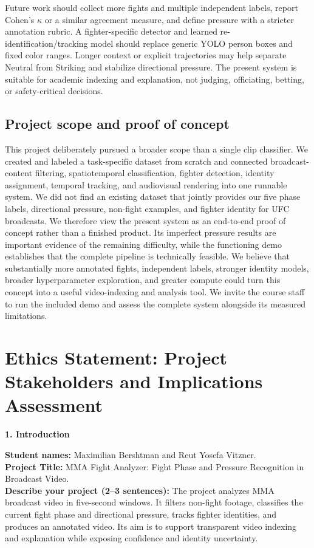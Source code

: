 \documentclass[10pt,twocolumn]{article}
\newcommand{\projecttitle}{MMA Fight Analyzer: Fight Phase and Pressure Recognition in Broadcast Video}
\begin{document}
Future work should collect more fights and multiple independent labels, report Cohen's $\kappa$ or a similar agreement measure, and define pressure with a stricter annotation rubric. A fighter-specific detector and learned re-identification/tracking model should replace generic YOLO person boxes and fixed color ranges. Longer context or explicit trajectories may help separate Neutral from Striking and stabilize directional pressure. The present system is suitable for academic indexing and explanation, not judging, officiating, betting, or safety-critical decisions.

\newpage
\subsection{Project scope and proof of concept}

This project deliberately pursued a broader scope than a single clip classifier. We created and labeled a task-specific dataset from scratch and connected broadcast-content filtering, spatiotemporal classification, fighter detection, identity assignment, temporal tracking, and audiovisual rendering into one runnable system. We did not find an existing dataset that jointly provides our five phase labels, directional pressure, non-fight examples, and fighter identity for UFC broadcasts. We therefore view the present system as an end-to-end proof of concept rather than a finished product. Its imperfect pressure results are important evidence of the remaining difficulty, while the functioning demo establishes that the complete pipeline is technically feasible. We believe that substantially more annotated fights, independent labels, stronger identity models, broader hyperparameter exploration, and greater compute could turn this concept into a useful video-indexing and analysis tool. We invite the course staff to run the included demo and assess the complete system alongside its measured limitations.

\clearpage
\onecolumn
\section{Ethics Statement: Project Stakeholders and Implications Assessment}

\noindent\textbf{1. Introduction}

\noindent\textbf{Student names:} Maximilian Bershtman and Reut Yosefa Vitzner.\\
\textbf{Project Title:} \projecttitle.\\
\textbf{Describe your project (2--3 sentences):} The project analyzes MMA broadcast video in five-second windows. It filters non-fight footage, classifies the current fight phase and directional pressure, tracks fighter identities, and produces an annotated video. Its aim is to support transparent video indexing and explanation while exposing confidence and identity uncertainty.
\end{document}
